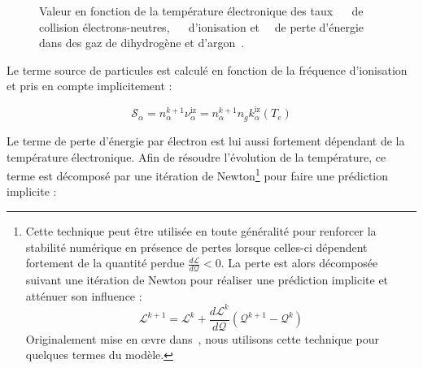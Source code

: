 \begin{refsection}
\begin{figure}[!htbp]
    \centering
    \caption{Valeur en fonction de la température électronique des taux
    ~~ de collision électrons-neutres,
    ~~ d'ionisation et~~ de perte
    d'énergie dans des gaz de dihydrogène et d'argon~\parencite{siglo}.}
    \label{3-tauxcollision}
\end{figure}

Le terme source de particules est calculé en fonction de la fréquence
d'ionisation et pris en compte implicitement :

\begin{equation}
\mathcal{S}_{\alpha}=n_\alpha^{k+1} \nu_\alpha^\text{iz}=n_\alpha^{k+1} n_g
k_{\alpha}^\text{iz}(T_e)
\end{equation}

Le terme de perte d'énergie par électron est lui aussi fortement dépendant de la
température électronique. Afin de
résoudre l'évolution de la température, ce terme est décomposé par une itération
de Newton\footnote{Cette technique peut être utilisée en toute généralité pour
renforcer la stabilité numérique en présence de pertes lorsque celles-ci
dépendent fortement de la quantité perdue 
$\frac{d\mathcal L}{d\mathcal Q}<0$.
La perte est alors décomposée suivant une itération de Newton pour
réaliser une prédiction implicite et atténuer son influence :
\begin{equation*}
\mathcal L^{k+1}=\mathcal L^{k}+\frac{d\mathcal L^{k}}{d\mathcal Q}(\mathcal
Q^{k+1}-\mathcal Q^k) \end{equation*}
Originalement mise en \oe vre dans~\parencite{HagelaarImpl}, nous utilisons cette technique pour quelques
termes du modèle.} pour faire une prédiction implicite :


\end{refsection}
